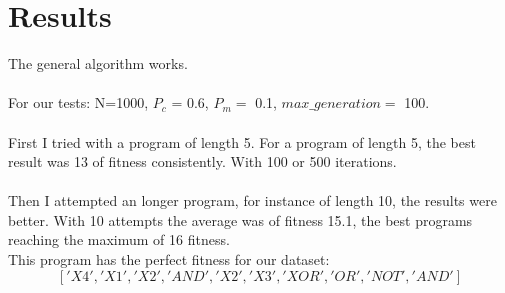 \documentclass[a4paper]{article}
\begin{document}
\section{Results}
The general algorithm works.\\\\
For our tests: N=1000, $P_c$ = 0.6, $P_m = $ 0.1, $max\_generation = $ 100.\\\\
First I tried with a program of length 5. For a program of length 5, the best result was 13 of fitness consistently. With 100 or 500 iterations.\\\\
Then I attempted an longer program, for instance of length 10, the results were better. With 10 attempts the average was of fitness 15.1, the best programs reaching the maximum of 16 fitness.\\
This program has the perfect fitness for our dataset:\\
$$['X4', 'X1', 'X2', 'AND', 'X2', 'X3', 'XOR', 'OR', 'NOT', 'AND']$$
\end{document}
